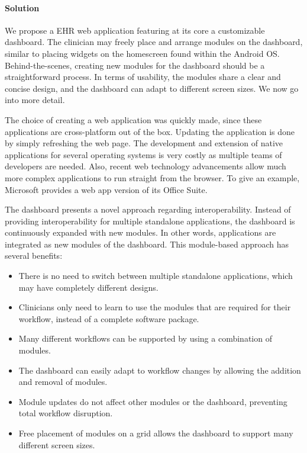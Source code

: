     \paragraph{Solution} We propose a EHR web application featuring at its core a customizable dashboard. The clinician may freely place and arrange modules on the dashboard, similar to placing widgets on the homescreen found within the Android OS\@. Behind-the-scenes, creating new modules for the dashboard should be a straightforward process. In terms of usability, the modules share a clear and concise design, and the dashboard can adapt to different screen sizes. We now go into more detail.

    The choice of creating a web application was quickly made, since these applications are cross-platform out of the box. Updating the application is done by simply refreshing the web page. The development and extension of native applications for several operating systems is very costly as multiple teams of developers are needed. Also, recent web technology advancements allow much more complex applications to run straight from the browser. To give an example, Microsoft provides a web app version of its Office Suite. 

    The dashboard presents a novel approach regarding interoperability. Instead of providing interoperability for multiple standalone applications, the dashboard is continuously expanded with new modules. In other words, applications are integrated as new modules of the dashboard. This module-based approach has several benefits:
    \begin{itemize}
        \item There is no need to switch between multiple standalone applications, which may have completely different designs.
        \item Clinicians only need to learn to use the modules that are required for their workflow, instead of a complete software package.
        \item Many different workflows can be supported by using a combination of modules.
        \item The dashboard can easily adapt to workflow changes by allowing the addition and removal of modules.
        \item Module updates do not affect other modules or the dashboard, preventing total workflow disruption.
        \item Free placement of modules on a grid allows the dashboard to support many different screen sizes.
    \end{itemize}

